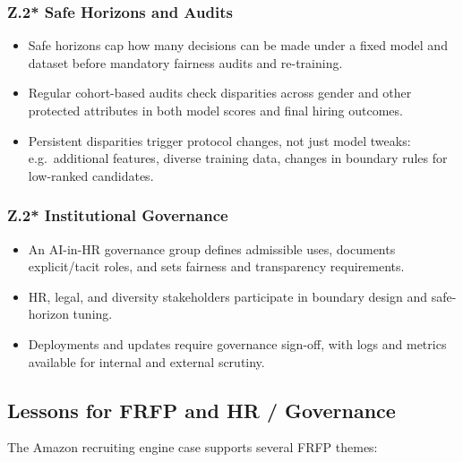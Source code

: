 \subsubsection*{Z.2* Safe Horizons and Audits}

\begin{itemize}
  \item Safe horizons cap how many decisions can be made under a fixed model
        and dataset before mandatory fairness audits and re-training.
  \item Regular cohort-based audits check disparities across gender and other
        protected attributes in both model scores and final hiring outcomes.
  \item Persistent disparities trigger protocol changes, not just model tweaks:
        e.g.\ additional features, diverse training data, changes in boundary
        rules for low-ranked candidates.
\end{itemize}

\subsubsection*{Z.2* Institutional Governance}

\begin{itemize}
  \item An AI-in-HR governance group defines admissible uses, documents
        explicit/tacit roles, and sets fairness and transparency requirements.
  \item HR, legal, and diversity stakeholders participate in boundary
        design and safe-horizon tuning.
  \item Deployments and updates require governance sign-off, with logs
        and metrics available for internal and external scrutiny.
\end{itemize}

\subsection{Lessons for FRFP and HR / Governance}

The Amazon recruiting engine case supports several FRFP themes:


